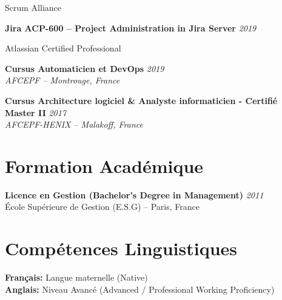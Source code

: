 \documentclass[11pt,a4paper]{article}
\begin{document}
Scrum Alliance

\textbf{Jira ACP-600 -- Project Administration in Jira Server} \hfill \textit{2019}

Atlassian Certified Professional

\textbf{Cursus Automaticien et DevOps} \hfill \textit{2019}\\
\textit{AFCEPF -- Montrouge, France}

\textbf{Cursus Architecture logiciel \& Analyste informaticien - Certifié Master II} \hfill \textit{2017}\\
\textit{AFCEPF-HENIX -- Malakoff, France}

\section*{Formation Académique}

\textbf{Licence en Gestion (Bachelor's Degree in Management)} \hfill \textit{2011}\\
École Supérieure de Gestion (E.S.G) -- Paris, France

\section*{Compétences Linguistiques}

\textbf{Français:} Langue maternelle (Native)\\
\textbf{Anglais:} Niveau Avancé (Advanced / Professional Working Proficiency)
\end{document}
